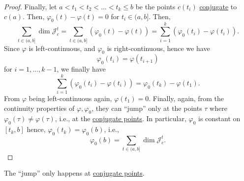\begin{proof}
	Finally, let \(a < t_1 < t_2 < \dots < t_k \leq b\) be the points \(c(t_i)\) \hyperref[def:conjugate-point]{conjugate} to \(c(a)\). Then, \(\varphi _0(t) - \varphi (t) = 0\) for \(t_i\in (a, b]\). Then,
	\[
		\sum_{t\in (a, b]} \dim \mathcal{J} _c^t
		= \sum_{t\in (a, b]} (\varphi _0(t) - \varphi (t))
		= \sum_{i=1}^k (\varphi _0 (t_i) - \varphi (t_i)).
	\]
	Since \(\varphi \) is left-continuous, and \(\varphi _0\) is right-continuous, hence we have
	\[
		\varphi _0(t_i) = \varphi (t_{i+1})
	\]
	for \(i = 1, \dots , k-1\), we finally have
	\[
		\sum_{i=1}^k \left( \varphi _0(t_i) - \varphi (t_i) \right) = \varphi _0(t_k) - \varphi (t_1).
	\]
	From \(\varphi \) being left-continuous again, \(\varphi (t_1) = 0\). Finally, again, from the continuity properties of \(\varphi , \varphi _0\), they can ``jump'' only at the points \(\tau \) where \(\varphi _0(\tau ) \neq \varphi (\tau )\), i.e., at the \hyperref[def:conjugate-point]{conjugate points}. In particular, \(\varphi _0\) is constant on \([t_k, b]\) hence, \(\varphi _0(t_k) = \varphi _0(b)\), i.e.,
	\[
		\varphi _0(b) = \sum_{t\in (a, b]} \dim \mathcal{J} _c^t.
	\]
\end{proof}

\begin{intuition}
	The ``jump'' only happens at \hyperref[def:conjugate-point]{conjugate points}.
\end{intuition}